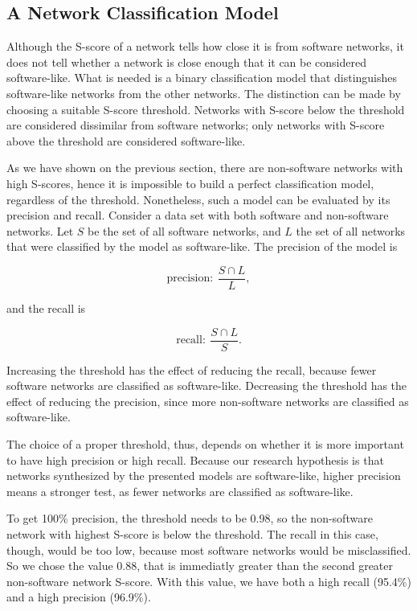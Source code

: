 \subsection{A Network Classification Model} \label{sec:classmodel}

Although the S-score of a network tells how close it is from software networks,
it does not tell whether a network is close enough that it can be considered
software-like. What is needed is a binary classification model that
distinguishes software-like networks from the other networks. The distinction
can be made by choosing a suitable S-score threshold. Networks with S-score
below the threshold are considered dissimilar from software networks; only
networks with S-score above the threshold are considered software-like. 

As we have shown on the previous section, there are non-software networks with
high S-scores, hence it is impossible to build a perfect classification model,
regardless of the threshold. Nonetheless, such a model can be evaluated by its
precision and recall. Consider a data set with both software and non-software
networks. Let $S$ be the set of all software networks, and $L$ the set of all
networks that were classified by the model as software-like. The precision of
the model is

$$
\mathrm{precision}: ~\frac{S \cap L}{L},
$$

and the recall is

$$
\mathrm{recall}: ~\frac{S \cap L}{S}.
$$

Increasing the threshold has the effect of reducing the recall, because fewer
software networks are classified as software-like. Decreasing the threshold has
the effect of reducing the precision, since more non-software networks are
classified as software-like. 

The choice of a proper threshold, thus, depends on whether it is more important
to have high precision or high recall. Because our research hypothesis is that
networks synthesized by the presented models are software-like, higher precision
means a stronger test, as fewer networks are classified as software-like.

To get 100\% precision, the threshold needs to be 0.98, so the non-software
network with highest S-score is below the threshold. The recall in this case,
though, would be too low, because most software networks would be misclassified.
So we chose the value 0.88, that is immediatly greater than the second greater
non-software network S-score. With this value, we have both a high recall
(95.4\%) and a high precision (96.9\%).

